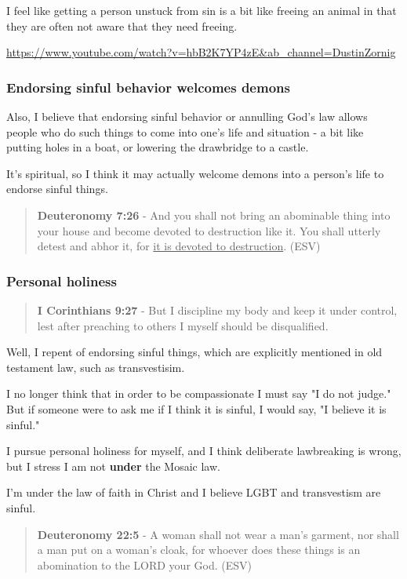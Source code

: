 \documentclass[11pt]{article}
\begin{document}
I feel like getting a person unstuck from sin
is a bit like freeing an animal in that they
are often not aware that they need freeing.

\url{https://www.youtube.com/watch?v=hbB2K7YP4zE\&ab\_channel=DustinZornig}

\subsubsection{Endorsing sinful behavior welcomes demons}
\label{sec:org91f1707}
Also, I believe that endorsing sinful behavior
or annulling God's law allows people who do
such things to come into one's life and
situation - a bit like putting holes in a
boat, or lowering the drawbridge to a castle.

It's spiritual, so I think it may actually
welcome demons into a person's life to endorse
sinful things.

\begin{quote}
\textbf{Deuteronomy 7:26} - And you shall not bring an abominable thing into your house and become devoted to destruction like it. You shall utterly detest and abhor it, for \uline{it is devoted to destruction}.  (ESV)
\end{quote}

\subsubsection{Personal holiness}
\label{sec:orgbb5570c}
\begin{quote}
\textbf{I Corinthians 9:27} - But I discipline my body and keep it under control, lest after preaching to others I myself should be disqualified.
\end{quote}

Well, I repent of endorsing sinful things,
which are explicitly mentioned in old
testament law, such as transvestisim.

I no longer think that in order to be compassionate I must say "I do not judge."
But if someone were to ask me if I think it is sinful, I would say, "I believe it is sinful."

I pursue personal holiness for myself, and I
think deliberate lawbreaking is wrong,
but I stress I am not \textbf{under} the Mosaic law.

I'm under the law of faith in Christ and I believe
LGBT and transvestism are sinful.

\begin{quote}
\textbf{Deuteronomy 22:5} - A woman shall not wear a man's garment, nor shall a man put on a woman's cloak, for whoever does these things is an abomination to the LORD your God. (ESV)
\end{quote}
\end{document}
